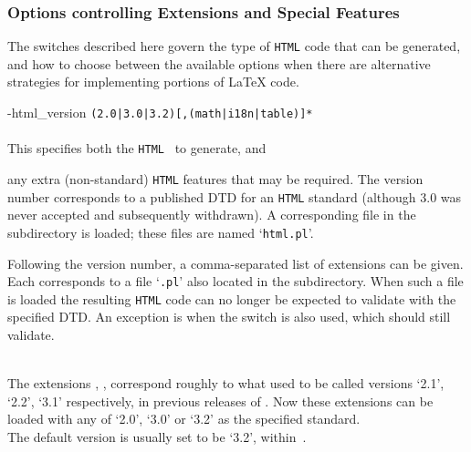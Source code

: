 \subsubsection{Options controlling Extensions and Special Features}
%
\html{\\}\noindent
The switches described here govern the type of \texttt{HTML} code that
can be generated, and how to choose between the available options
when there are alternative strategies for implementing portions of \LaTeX{} code.

\begin{htmllist}%
%
%
%
\item [ -html\_version \texttt{(2.0|3.0|3.2)[,(math|i18n|table)]*}\label{htmlversion}]
~\\\\
This specifies both the \texttt{HTML}~ to generate,
and\html{ \dots}%
\begin{changebar}
any extra (non-standard) \texttt{HTML} features that may be required.\html{\\}
The version number corresponds to a published DTD for an \texttt{HTML} standard
(although 3.0 was never accepted and subsequently withdrawn).
A corresponding \Perl{} file in the  subdirectory is loaded;
these files are named `\texttt{html}\texttt{.pl}'.

Following the version number, a comma-separated list of extensions
can be given. Each corresponds to a file `\texttt{.pl}'
also located in the  subdirectory.
When such a file is loaded the resulting \texttt{HTML} code
can no longer be expected to validate with the specified DTD.
An exception is  when the 
switch is also used, which should still validate.
\end{changebar}
\\
The extensions , , 
correspond roughly to what used to be called versions `2.1', `2.2', `3.1'
respectively, in previous releases of \latextohtml.
Now these extensions can be loaded with any of `2.0', `3.0' or `3.2'
as the specified standard.\\
The default version is usually set to be `3.2', within \,.%


\end{htmllist}
